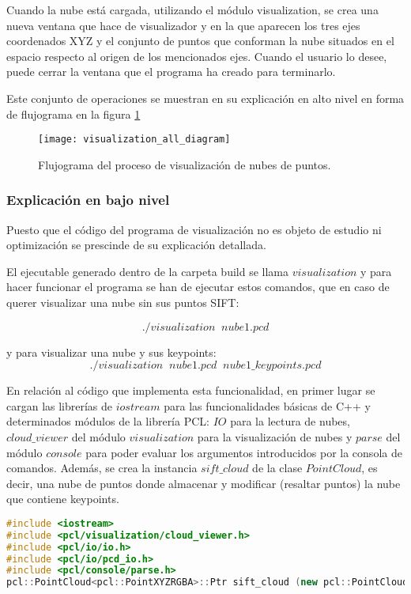 Cuando la nube está cargada, utilizando el módulo visualization, se crea una nueva ventana que hace de visualizador y en la que aparecen los tres ejes coordenados XYZ y el conjunto de puntos que conforman la nube situados en el espacio respecto al origen de los mencionados ejes. Cuando el usuario lo desee, puede cerrar la ventana que el programa ha creado para terminarlo.

Este conjunto de operaciones se muestran en su explicación en alto nivel en forma de flujograma en la figura \ref{fig:visualization_all_diagram}

\begin{figure}
\centering
\texttt{[image: visualization\_all\_diagram]}
\caption{Flujograma del proceso de visualización de nubes de puntos.}\label{fig:visualization_all_diagram}
\end{figure}


\subsubsection{Explicación en bajo nivel}
Puesto que el código del programa de visualización no es objeto de estudio ni optimización se prescinde de su explicación detallada.

\iffalse
El ejecutable generado dentro de la carpeta build se llama $visualization$ y para hacer funcionar el programa se han de ejecutar estos comandos, que en caso de querer visualizar una nube sin sus puntos SIFT:

$$./visualization \;\; nube1.pcd$$

y para visualizar una nube y sus keypoints:
$$./visualization \;\; nube1.pcd \;\; nube1\_keypoints.pcd$$



En relación al código que implementa esta funcionalidad, en primer lugar se cargan las librerías de $iostream$ para las funcionalidades básicas de C++ y determinados módulos de la librería PCL: $IO$ para la lectura de nubes, $cloud\_viewer$ del módulo $visualization$ para la visualización de nubes y $parse$ del módulo $console$ para poder evaluar los argumentos introducidos por la consola de comandos.
Además, se crea la instancia $sift\_cloud$ de la clase $PointCloud$, es decir, una nube de puntos donde almacenar y modificar (resaltar puntos) la nube que contiene keypoints.

\begin{lstlisting}[language=C++,breaklines]
#include <iostream>
#include <pcl/visualization/cloud_viewer.h>
#include <pcl/io/io.h>
#include <pcl/io/pcd_io.h>
#include <pcl/console/parse.h>
pcl::PointCloud<pcl::PointXYZRGBA>::Ptr sift_cloud (new pcl::PointCloud<pcl::PointXYZRGBA>);
\end{lstlisting}

